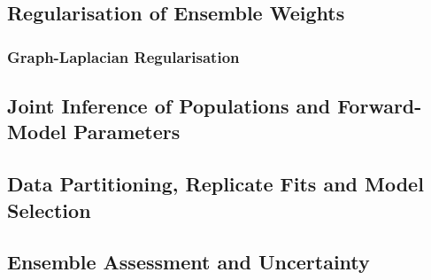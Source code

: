 \subsection{Regularisation of Ensemble Weights}
\label{sec:jaxent-regularisation}

\subsubsection{Graph-Laplacian Regularisation}
\label{sec:jaxent-laplacian}

\subsection{Joint Inference of Populations and Forward-Model Parameters}
\label{sec:jaxent-joint}

\subsection{Data Partitioning, Replicate Fits and Model Selection}
\label{sec:jaxent-validation}

\subsection{Ensemble Assessment and Uncertainty}
\label{sec:jaxent-assessment}

